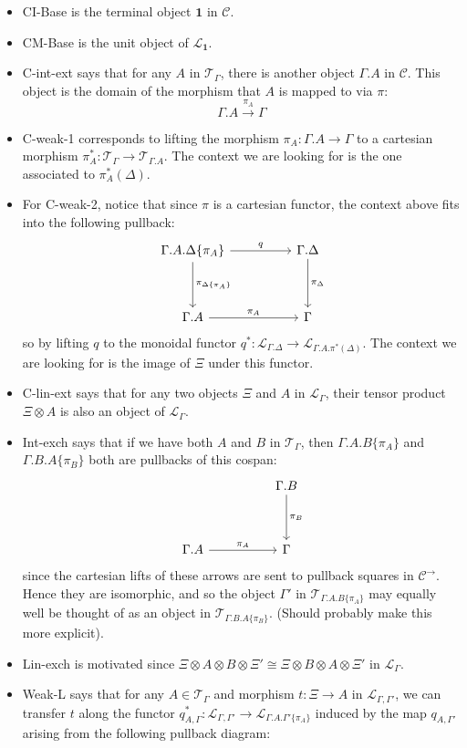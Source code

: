 \begin{itemize}
\item CI-Base is the terminal object $\mathbf{1}$ in $\mathcal{C}$.
\item CM-Base is the unit object of $\mathcal{L}_{\mathbf{1}}$.
\item C-int-ext says that for any $A$ in $\mathcal{T}_{\Gamma}$, there is another object $\Gamma.A$ in $\mathcal{C}$. This object is the domain of the morphism that $A$ is mapped to via $\pi$:
\[\Gamma.A \xrightarrow {\pi_A} \Gamma\]
\item C-weak-1 corresponds to lifting the morphism $\pi_A : \Gamma.A \to \Gamma$ to a cartesian morphism $\pi_A^* : \mathcal{T}_\Gamma \to \mathcal{T}_{\Gamma.A}$. The context we are looking for is the one associated to $\pi_A^*(\Delta)$.
\item For C-weak-2, notice that since $\pi$ is a cartesian functor, the context above fits into the following pullback:
\[
\ti
\Gamma.A.\Delta\{\pi_A\} \ar[r, "q"] \ar[d, "\pi_{\Delta\{\pi_A\}}"]  & \Gamma.\Delta \ar[d, "\pi_\Delta"]\\
\Gamma.A \ar[r, "\pi_A"] & \Gamma
\kz
\]
so by lifting $q$ to the monoidal functor $q^* : \mathcal{L}_{\Gamma.\Delta} \to \mathcal{L}_{\Gamma.A.\pi^*(\Delta)}$. The context we are looking for is the image of $\Xi$ under this functor.
\item C-lin-ext says that for any two objects $\Xi$ and $A$ in $\mathcal{L}_{\Gamma}$, their tensor product $\Xi \otimes A$ is also an object of $\mathcal{L}_{\Gamma}$.
\item Int-exch says that if we have both $A$ and $B$ in $\mathcal{T}_{\Gamma}$, then $\Gamma.A.B\{\pi_A\}$ and $\Gamma.B.A\{\pi_B\}$ both are pullbacks of this cospan:
\[
\ti
& \Gamma.B \ar[d, "\pi_B"]\\
\Gamma.A \ar[r, "\pi_A"] & \Gamma
\kz
\]
since the cartesian lifts of these arrows are sent to pullback squares in $\mathcal{C}^\to$. Hence they are isomorphic, and so the object $\Gamma'$ in $\mathcal{T}_{\Gamma.A.B\{\pi_A\}}$ may equally well be thought of as an object in $\mathcal{T}_{\Gamma.B.A\{\pi_B\}}$. (Should probably make this more explicit).
\item Lin-exch is motivated since $\Xi \otimes A \otimes B \otimes \Xi' \cong \Xi \otimes B \otimes A \otimes \Xi'$ in $\mathcal{L}_{\Gamma}$.
\item Weak-L says that for any $A \in \mathcal{T}_{\Gamma}$ and morphism $t : \Xi \to A$ in $\mathcal{L}_{\Gamma, \Gamma'}$, we can transfer $t$ along the functor $q_{A, \Gamma}^* : \mathcal{L}_{\Gamma, \Gamma'} \to \mathcal{L}_{\Gamma.A.\Gamma'\{\pi_A\}}$ induced by the map $q_{A, \Gamma'}$ arising from the following pullback diagram:

\end{itemize}
